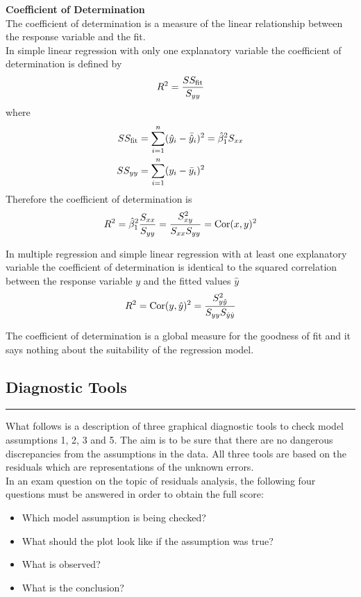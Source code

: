 \textbf{Coefficient of Determination}\\
The coefficient of determination is a measure of the linear relationship between the response variable and the fit.\\
In simple linear regression with only one explanatory variable the coefficient of determination is defined by
\begin{equation}
  R^2 = \frac{SS_{\textup{fit}}}{S_{yy}}
\end{equation}
where
\begin{equation}
  \begin{split}
    SS_{\textup{fit}} &= \sum_{i=1}^n(\hat{y}_i - \bar{\hat{y}}_i)^2 = \hat{\beta}_1^2 S_{xx}\\
    SS_{yy} &= \sum_{i=1}^n(y_i - \bar{y}_i)^2
  \end{split}
\end{equation}
Therefore the coefficient of determination is
\begin{equation}
  R^2 = \hat{\beta}_1^2 \frac{S_{xx}}{S_{yy}} = \frac{S_{xy}^2}{S_{xx} S_{yy}} = \textup{Cor}(x, y)^2
\end{equation}

In multiple regression and simple linear regression with at least one explanatory variable the coefficient of determination is identical to the squared correlation between the response variable $y$ and the fitted values $\hat{y}$
\begin{equation}
  R^2 = \textup{Cor}(y, \hat{y})^2 = \frac{S_{y\hat{y}}^2}{S_{yy} S_{\hat{y}\hat{y}}}
\end{equation}

The coefficient of determination is a global measure for the goodness of fit and it says nothing about the suitability of the regression model.

\subsection{Diagnostic Tools}
\noindent\rule[\linienAbstand]{\linewidth}{\linienDicke}
What follows is a description of three graphical diagnostic tools to check model assumptions 1, 2, 3 and 5. The aim is to be sure that there are no dangerous discrepancies from the assumptions in the data. All three tools are based on the residuals which are representations of the unknown errors.\\
In an exam question on the topic of residuals analysis, the following four questions must be answered in order to obtain the full score:
\begin{itemize}
  \item Which model assumption is being checked?
  \item What should the plot look like if the assumption was true?
  \item What is observed?
  \item What is the conclusion?
\end{itemize}

